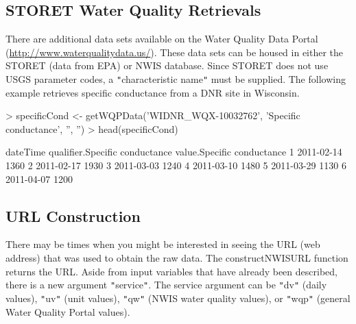 \documentclass[a4paper,11pt]{article}
\begin{document}
\FloatBarrier
\subsection{STORET Water Quality Retrievals}
\label{sec:usgsSTORET}
There are additional data sets available on the Water Quality Data Portal (\url{http://www.waterqualitydata.us/}).  These data sets can be housed in either the STORET (data from EPA) or NWIS database.  Since STORET does not use USGS parameter codes, a \texttt{"}characteristic name\texttt{"} must be supplied.  The following example retrieves specific conductance from a DNR site in Wisconsin.

\begin{Schunk}
\begin{Sinput}
> specificCond <- getWQPData('WIDNR_WQX-10032762', 
         'Specific conductance', '', '')
> head(specificCond)
\end{Sinput}
\begin{Soutput}
    dateTime qualifier.Specific conductance value.Specific conductance
1 2011-02-14                                                      1360
2 2011-02-17                                                      1930
3 2011-03-03                                                      1240
4 2011-03-10                                                      1480
5 2011-03-29                                                      1130
6 2011-04-07                                                      1200
\end{Soutput}
\end{Schunk}

\FloatBarrier
\subsection{URL Construction}
\label{sec:usgsURL}
There may be times when you might be interested in seeing the URL (web address) that was used to obtain the raw data. The constructNWISURL function returns the URL.  Aside from input variables that have already been described, there is a new argument \texttt{"}service\texttt{"}. The service argument can be \texttt{"}dv\texttt{"} (daily values), \texttt{"}uv\texttt{"} (unit values), \texttt{"}qw\texttt{"} (NWIS water quality values), or \texttt{"}wqp\texttt{"} (general Water Quality Portal values).
 
\end{document}

